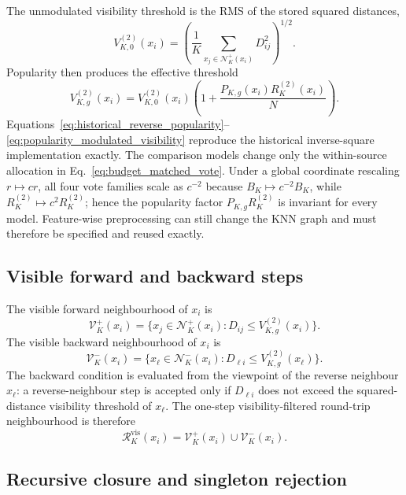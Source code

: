 \documentclass[pdflatex,sn-mathphys-num]{sn-jnl}
\newcommand{\calN}{\mathcal{N}}
\newcommand{\calR}{\mathcal{R}}
\newcommand{\calV}{\mathcal{V}}
\begin{document}
The unmodulated visibility threshold is the RMS of the stored squared distances,
\begin{equation}
V_{K,0}^{(2)}(x_i)=
\left(
\frac{1}{K}
\sum_{x_j\in\calN_K^+(x_i)}D_{ij}^{2}
\right)^{1/2}.
\label{eq:rms_visibility_base}
\end{equation}
Popularity then produces the effective threshold
\begin{equation}
V_{K,g}^{(2)}(x_i)=V_{K,0}^{(2)}(x_i)
\left(1+\frac{P_{K,g}(x_i)R_K^{(2)}(x_i)}{N}\right).
\label{eq:popularity_modulated_visibility}
\end{equation}
Equations~\eqref{eq:historical_reverse_popularity}--\eqref{eq:popularity_modulated_visibility} reproduce the historical inverse-square implementation exactly. The comparison models change only the within-source allocation in Eq.~\eqref{eq:budget_matched_vote}. Under a global coordinate rescaling $r\mapsto cr$, all four vote families scale as $c^{-2}$ because $B_K\mapsto c^{-2}B_K$, while $R_K^{(2)}\mapsto c^2R_K^{(2)}$; hence the popularity factor $P_{K,g}R_K^{(2)}$ is invariant for every model. Feature-wise preprocessing can still change the KNN graph and must therefore be specified and reused exactly.

\subsection{Visible forward and backward steps}

The visible forward neighbourhood of $x_i$ is
\begin{equation}
\calV_K^+(x_i)=
\{x_j\in\calN_K^+(x_i):D_{ij}\leq V_{K,g}^{(2)}(x_i)\}.
\label{eq:visible_forward}
\end{equation}
The visible backward neighbourhood of $x_i$ is
\begin{equation}
\calV_K^-(x_i)=
\{x_\ell\in\calN_K^-(x_i):D_{\ell i}\leq V_{K,g}^{(2)}(x_\ell)\}.
\label{eq:visible_backward}
\end{equation}
The backward condition is evaluated from the viewpoint of the reverse neighbour $x_\ell$: a reverse-neighbour step is accepted only if $D_{\ell i}$ does not exceed the squared-distance visibility threshold of $x_\ell$. The one-step visibility-filtered round-trip neighbourhood is therefore
\begin{equation}
\calR_K^{\mathrm{vis}}(x_i)=\calV_K^+(x_i)\cup\calV_K^-(x_i).
\label{eq:visible_roundtrip}
\end{equation}

\subsection{Recursive closure and singleton rejection}
\end{document}
